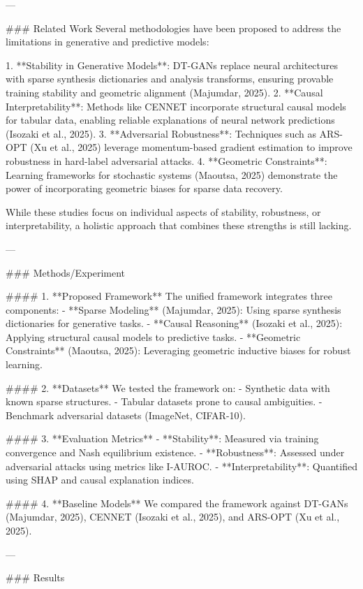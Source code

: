 ---

### Related Work  
Several methodologies have been proposed to address the limitations in generative and predictive models:

1. **Stability in Generative Models**: DT-GANs replace neural architectures with sparse synthesis dictionaries and analysis transforms, ensuring provable training stability and geometric alignment (Majumdar, 2025).  
2. **Causal Interpretability**: Methods like CENNET incorporate structural causal models for tabular data, enabling reliable explanations of neural network predictions (Isozaki et al., 2025).  
3. **Adversarial Robustness**: Techniques such as ARS-OPT (Xu et al., 2025) leverage momentum-based gradient estimation to improve robustness in hard-label adversarial attacks.  
4. **Geometric Constraints**: Learning frameworks for stochastic systems (Maoutsa, 2025) demonstrate the power of incorporating geometric biases for sparse data recovery.

While these studies focus on individual aspects of stability, robustness, or interpretability, a holistic approach that combines these strengths is still lacking.

---

### Methods/Experiment  

#### 1. **Proposed Framework**  
The unified framework integrates three components:  
- **Sparse Modeling** (Majumdar, 2025): Using sparse synthesis dictionaries for generative tasks.  
- **Causal Reasoning** (Isozaki et al., 2025): Applying structural causal models to predictive tasks.  
- **Geometric Constraints** (Maoutsa, 2025): Leveraging geometric inductive biases for robust learning.  

#### 2. **Datasets**  
We tested the framework on:  
- Synthetic data with known sparse structures.  
- Tabular datasets prone to causal ambiguities.  
- Benchmark adversarial datasets (ImageNet, CIFAR-10).

#### 3. **Evaluation Metrics**  
- **Stability**: Measured via training convergence and Nash equilibrium existence.  
- **Robustness**: Assessed under adversarial attacks using metrics like I-AUROC.  
- **Interpretability**: Quantified using SHAP and causal explanation indices.

#### 4. **Baseline Models**  
We compared the framework against DT-GANs (Majumdar, 2025), CENNET (Isozaki et al., 2025), and ARS-OPT (Xu et al., 2025).

---

### Results  

